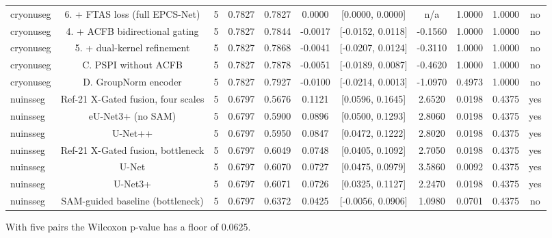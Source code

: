 \begin{table}[H]
{\begin{tabular}{lcccccccccc}
cryonuseg & 6. + FTAS loss (full EPCS-Net) & 5 & 0.7827 & 0.7827 & 0.0000 & [0.0000, 0.0000] & n/a & 1.0000 & 1.0000 & no \\
cryonuseg & 4. + ACFB bidirectional gating & 5 & 0.7827 & 0.7844 & -0.0017 & [-0.0152, 0.0118] & -0.1560 & 1.0000 & 1.0000 & no \\
cryonuseg & 5. + dual-kernel refinement & 5 & 0.7827 & 0.7868 & -0.0041 & [-0.0207, 0.0124] & -0.3110 & 1.0000 & 1.0000 & no \\
cryonuseg & C. PSPI without ACFB & 5 & 0.7827 & 0.7878 & -0.0051 & [-0.0189, 0.0087] & -0.4620 & 1.0000 & 1.0000 & no \\
cryonuseg & D. GroupNorm encoder & 5 & 0.7827 & 0.7927 & -0.0100 & [-0.0214, 0.0013] & -1.0970 & 0.4973 & 1.0000 & no \\
nuinsseg & Ref-21 X-Gated fusion, four scales & 5 & 0.6797 & 0.5676 & 0.1121 & [0.0596, 0.1645] & 2.6520 & 0.0198 & 0.4375 & yes \\
nuinsseg & eU-Net3+ (no SAM) & 5 & 0.6797 & 0.5900 & 0.0896 & [0.0500, 0.1293] & 2.8060 & 0.0198 & 0.4375 & yes \\
nuinsseg & U-Net++ & 5 & 0.6797 & 0.5950 & 0.0847 & [0.0472, 0.1222] & 2.8020 & 0.0198 & 0.4375 & yes \\
nuinsseg & Ref-21 X-Gated fusion, bottleneck & 5 & 0.6797 & 0.6049 & 0.0748 & [0.0405, 0.1092] & 2.7050 & 0.0198 & 0.4375 & yes \\
nuinsseg & U-Net & 5 & 0.6797 & 0.6070 & 0.0727 & [0.0475, 0.0979] & 3.5860 & 0.0092 & 0.4375 & yes \\
nuinsseg & U-Net3+ & 5 & 0.6797 & 0.6071 & 0.0726 & [0.0325, 0.1127] & 2.2470 & 0.0198 & 0.4375 & yes \\
nuinsseg & SAM-guided baseline (bottleneck) & 5 & 0.6797 & 0.6372 & 0.0425 & [-0.0056, 0.0906] & 1.0980 & 0.0701 & 0.4375 & no \\
\bottomrule
\end{tabular}}
\par\vspace{2pt}\footnotesize{With five pairs the Wilcoxon p-value has a floor of 0.0625.}
\end{table}